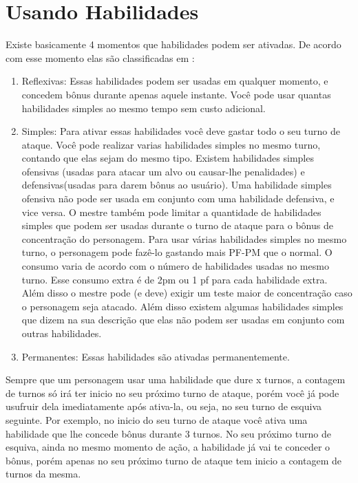 \section{Usando Habilidades}

Existe basicamente 4 momentos que habilidades podem ser ativadas. De acordo com esse momento elas são classificadas em :

\begin{enumerate}

\item Reflexivas: Essas habilidades podem ser usadas em qualquer momento, e concedem bônus durante apenas aquele instante. Você pode usar quantas habilidades simples ao mesmo tempo sem custo adicional.

\item Simples: Para ativar essas habilidades você deve gastar todo o seu turno de ataque. Você pode realizar varias habilidades simples no mesmo turno, contando que elas sejam do mesmo tipo. Existem habilidades simples ofensivas (usadas para atacar um alvo ou causar-lhe penalidades) e defensivas(usadas para darem bônus ao usuário). Uma habilidade simples ofensiva não pode ser usada em conjunto com uma habilidade defensiva, e vice versa. O mestre também pode limitar a quantidade de habilidades simples que podem ser usadas durante o turno de ataque para o bônus de concentração do personagem. Para usar várias habilidades simples no mesmo turno, o personagem pode fazê-lo gastando mais PF-PM que o normal. O consumo varia de acordo com o número de habilidades usadas no mesmo turno. Esse consumo extra é de 2pm ou 1 pf para cada habilidade extra. Além disso o mestre pode (e deve) exigir um teste maior de concentração caso o personagem seja atacado. Além disso existem algumas habilidades simples que dizem na sua descrição que elas não podem ser usadas em conjunto com outras habilidades.

\item Permanentes: Essas habilidades são ativadas permanentemente. 

\end{enumerate}

Sempre que um personagem usar uma habilidade que dure x turnos, a contagem de turnos só irá ter inicio no seu próximo turno de ataque, porém você já pode usufruir dela imediatamente após ativa-la, ou seja, no seu turno de esquiva seguinte. Por exemplo, no inicio do seu turno de ataque você ativa uma habilidade que lhe concede bônus durante 3 turnos. No seu próximo turno de esquiva, ainda no mesmo momento de ação, a habilidade já vai te conceder o bônus, porém apenas no seu próximo turno de ataque tem inicio a contagem de turnos da mesma. 

